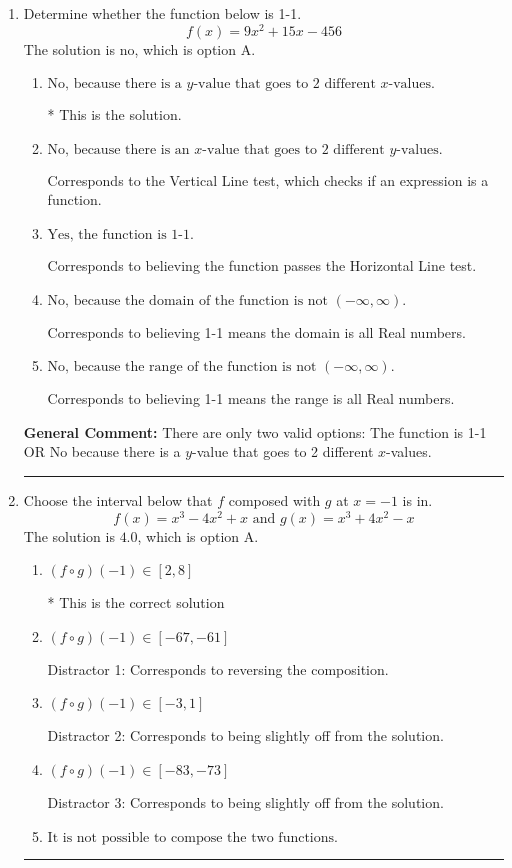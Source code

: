 \documentclass{extbook}[14pt]
\newcommand{\litem}[1]{\item #1

\rule{\textwidth}{0.4pt}}
\begin{document}
\begin{enumerate}\litem{
Determine whether the function below is 1-1.
\[ f(x) = 9 x^2 + 15 x - 456 \]The solution is \( \text{no} \), which is option A.\begin{enumerate}[label=\Alph*.]
\item \( \text{No, because there is a $y$-value that goes to 2 different $x$-values.} \)

* This is the solution.
\item \( \text{No, because there is an $x$-value that goes to 2 different $y$-values.} \)

Corresponds to the Vertical Line test, which checks if an expression is a function.
\item \( \text{Yes, the function is 1-1.} \)

Corresponds to believing the function passes the Horizontal Line test.
\item \( \text{No, because the domain of the function is not $(-\infty, \infty)$.} \)

Corresponds to believing 1-1 means the domain is all Real numbers.
\item \( \text{No, because the range of the function is not $(-\infty, \infty)$.} \)

Corresponds to believing 1-1 means the range is all Real numbers.
\end{enumerate}

\textbf{General Comment:} There are only two valid options: The function is 1-1 OR No because there is a $y$-value that goes to 2 different $x$-values.
}
\litem{
Choose the interval below that $f$ composed with $g$ at $x=-1$ is in.
\[ f(x) = x^{3} -4 x^{2} +x \text{ and } g(x) = x^{3} +4 x^{2} -x \]The solution is \( 4.0 \), which is option A.\begin{enumerate}[label=\Alph*.]
\item \( (f \circ g)(-1) \in [2, 8] \)

* This is the correct solution
\item \( (f \circ g)(-1) \in [-67, -61] \)

 Distractor 1: Corresponds to reversing the composition.
\item \( (f \circ g)(-1) \in [-3, 1] \)

 Distractor 2: Corresponds to being slightly off from the solution.
\item \( (f \circ g)(-1) \in [-83, -73] \)

 Distractor 3: Corresponds to being slightly off from the solution.
\item \( \text{It is not possible to compose the two functions.} \)



\end{enumerate}}
\end{enumerate}
\end{document}
